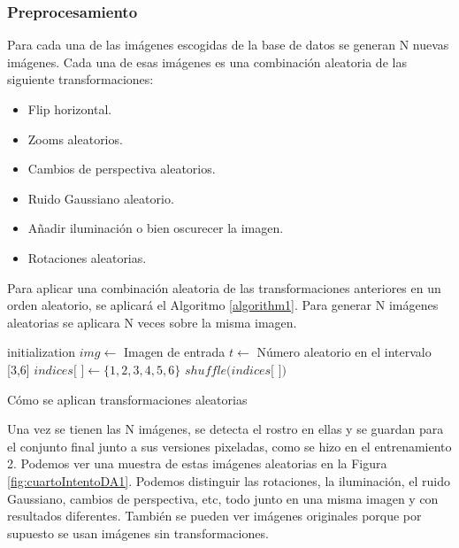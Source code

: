 \documentclass[a4paper,11pt]{book}
\begin{document}
\subsubsection{Preprocesamiento}
Para cada una de las imágenes escogidas de la base de datos se generan N nuevas imágenes. Cada una de esas imágenes es una combinación aleatoria de las siguiente transformaciones:
\begin{itemize}
	\item Flip horizontal.
	\item Zooms aleatorios.
	\item Cambios de perspectiva aleatorios.
	\item Ruido Gaussiano aleatorio.
	\item Añadir iluminación o bien oscurecer la imagen.
	\item Rotaciones aleatorias.
\end{itemize}
Para aplicar una combinación aleatoria de las transformaciones anteriores en un orden aleatorio, se aplicará el Algoritmo \ref{algorithm1}. Para generar N imágenes aleatorias se aplicara N veces sobre la misma imagen.\\

\begin{algorithm}[H]
	\BlankLine
	initialization\;
	$img \leftarrow$ Imagen de entrada\;
	$t \leftarrow$ Número aleatorio en el intervalo [3,6]\;
	$indices[$ $] \leftarrow \{1,2,3,4,5,6\}$\;
	$shuffle(indices[$ $])$\;
\caption{Cómo se aplican transformaciones aleatorias}
\label{algorithm1}
\end{algorithm}
\BlankLine
Una vez se tienen las N imágenes, se detecta el rostro en ellas y se guardan para el conjunto final junto a sus versiones pixeladas, como se hizo en el entrenamiento 2. Podemos ver una muestra de estas imágenes aleatorias en la Figura \ref{fig:cuartoIntentoDA1}. Podemos distinguir las rotaciones, la iluminación, el ruido Gaussiano, cambios de perspectiva, etc, todo junto en una misma imagen y con resultados diferentes. También se pueden ver imágenes originales porque por supuesto se usan imágenes sin transformaciones.\\
\end{document}
